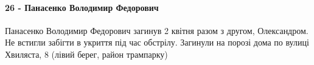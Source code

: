  
 
 
 
 

\paragraph{26 - Панасенко Володимир Федорович}

\raggedcolumns
\begin{multicols}{2} %
\setlength{\parindent}{0pt}

\begin{itemize} %

Панасенко Володимир Федорович загинув 2 квітня разом з другом, Олександром. Не
встигли забігти в укриття під час обстрілу. Загинули на порозі дома по вулиці
Хвиляста, 8 (лівий берег, район трампарку)

\end{itemize} %

\end{multicols} %
